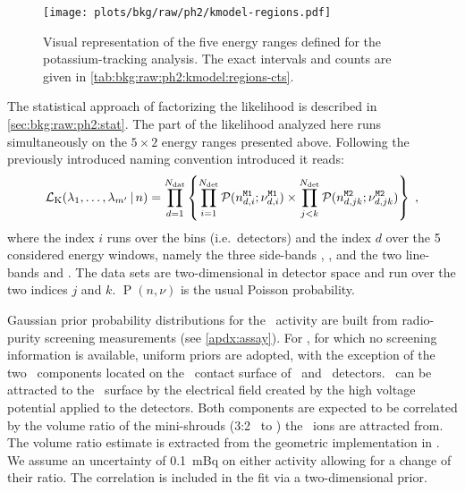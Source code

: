 \begin{figure}
  \centering
  \texttt{[image: plots/bkg/raw/ph2/kmodel-regions.pdf]}
  \caption{%
    Visual representation of the five energy ranges defined for the potassium-tracking
    analysis. The exact intervals and counts are given in
    \cref{tab:bkg:raw:ph2:kmodel:regions-cts}.
  }\label{fig:bkg:raw:ph2:kmodel:regions}
\end{figure}

The statistical approach of factorizing the likelihood is described in
\cref{sec:bkg:raw:ph2:stat}. The part of the likelihood analyzed here runs simultaneously
on the $5 \times 2$ energy ranges presented above. Following the previously introduced
naming convention introduced it reads:
\begin{equation}\label{eq:bkg:raw:ph2:kmodel:likelihood}
  \mathcal{L}_\text{K}(\lambda_1,\ldots,\lambda_{m'}\,|\,n) =
  \prod_{d=1}^{N_\text{dat}}
  \left\{
    \prod_{i=1}^{N_\text{det}}
    \mathcal{P}(n_{d,i}^\text{\texttt{M1}};\nu_{d,i}^\text{\texttt{M1}})
    \times
    \prod_{j<k}^{N_\text{det}}
    \mathcal{P}(n_{d,jk}^\text{\texttt{M2}};\nu_{d,jk}^\text{\texttt{M2}})
  \right\}\;,
\end{equation}
where the index $i$ runs over the bins (i.e.~detectors) and the index $d$ over the 5
considered energy windows, namely the three side-bands , ,  and the
two line-bands  and .  The  data sets are two-dimensional in detector
space and run over the two indices $j$ and $k$. $\operatorname{P}(n,\nu)$ is the usual
Poisson probability.

Gaussian prior probability distributions for the \kvn\ activity are built from
radio-purity screening measurements (see \cref{apdx:assay}). For \kvz, for which no
screening information is available, uniform priors are adopted, with the exception of the
two \kvz\ components located on the \nplus\ contact surface of \bege\ and \scoax\
detectors. \kvz\ can be attracted to the \nplus\ surface by the electrical field created
by the high voltage potential applied to the detectors. Both components are expected to be
correlated by the volume ratio of the mini-shrouds (3:2 \bege\ to \scoax) the \kvz\ ions
are attracted from. The volume ratio estimate is extracted from the geometric
implementation in \mage.  We assume an uncertainty of 0.1~mBq on either activity allowing
for a change of their ratio. The correlation is included in the fit via a two-dimensional
prior.

